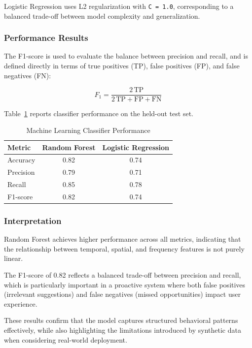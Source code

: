 Logistic Regression uses L2 regularization with \texttt{C = 1.0}, corresponding to a balanced trade-off between model complexity and generalization.

\subsubsection{Performance Results}

The F1-score is used to evaluate the balance between precision and recall, and is defined directly in terms of true positives (TP), false positives (FP), and false negatives (FN):

\begin{equation}
F_1 =
\frac{
2 \, \text{TP}
}{
2 \, \text{TP} + \text{FP} + \text{FN}
}
\end{equation}

Table~\ref{tab:ml_performance} reports classifier performance on the held-out test set.

\begin{table}[H]
\centering
\renewcommand{\arraystretch}{1.2}
\begin{tabular}{|l|c|c|}
\hline
\textbf{Metric} & \textbf{Random Forest} & \textbf{Logistic Regression} \\
\hline
Accuracy  & 0.82 & 0.74 \\
\hline
Precision & 0.79 & 0.71 \\
\hline
Recall    & 0.85 & 0.78 \\
\hline
F1-score  & 0.82 & 0.74 \\
\hline
\end{tabular}
\caption{Machine Learning Classifier Performance}
\label{tab:ml_performance}
\end{table}
\subsubsection{Interpretation}
\vspace{-0.6cm}
Random Forest achieves higher performance across all metrics, indicating that the relationship between temporal, spatial, and frequency features is not purely linear.

The F1-score of 0.82 reflects a balanced trade-off between precision and recall, which is particularly important in a proactive system where both false positives (irrelevant suggestions) and false negatives (missed opportunities) impact user experience.

These results confirm that the model captures structured behavioral patterns effectively, while also highlighting the limitations introduced by synthetic data when considering real-world deployment.

